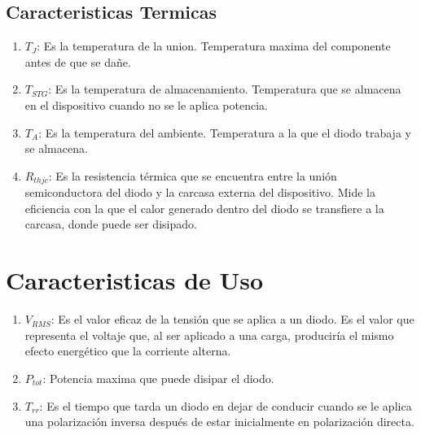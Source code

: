 \documentclass[chaptersright]{informeutn}
\begin{document}
        \subsection{Caracteristicas Termicas}
        \begin{enumerate}
            \item $T_J$: Es la temperatura de la union. Temperatura maxima del componente antes de que se dañe.\\
            \item $T_{STG}$: Es la temperatura de almacenamiento. Temperatura que se almacena en el dispositivo cuando
              no se le aplica potencia.\\
            \item $T_A$: Es la temperatura del ambiente. Temperatura a la que el diodo trabaja y se almacena.\\
            \item $R_{thjc}$: Es la resistencia térmica que se encuentra entre la unión semiconductora del diodo y la
              carcasa externa del dispositivo. Mide la eficiencia con la que el calor generado dentro del diodo se
              transfiere a la carcasa, donde puede ser disipado.
        \end{enumerate}


        \section{Caracteristicas de Uso}

        \begin{enumerate}
          \item $V_{RMS}$: Es el valor eficaz de la tensión que se aplica a un diodo. Es el valor que representa el
            voltaje que, al ser aplicado a una carga, produciría el mismo efecto energético que la corriente alterna.\\
          \item $P_{tot}$: Potencia maxima que puede disipar el diodo.\\
          \item $T_{rr}$: Es el tiempo que tarda un diodo en dejar de conducir cuando se le aplica una polarización
            inversa después de estar inicialmente en polarización directa.
        \end{enumerate}

  \printbibliography
\end{document}
